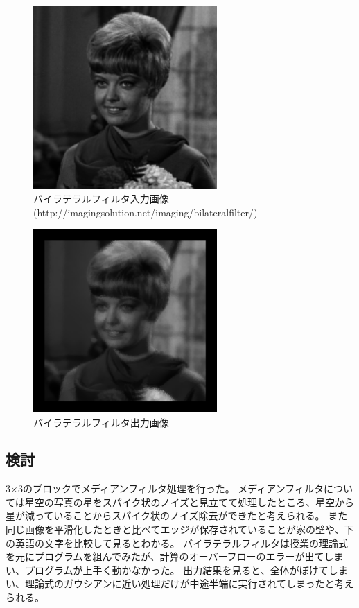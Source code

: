 \documentclass[11pt,a4j]{jsarticle}
\begin{document}
    \begin{figure}[H]
      \centering
      \includegraphics[clip,width=7.0cm ,height= 7.0cm]{./img/bilateral/bi_source.png}
      \caption{バイラテラルフィルタ入力画像(http://imagingsolution.net/imaging/bilateralfilter/)\label{fig:bilateral_source}}
    \end{figure}
    \begin{figure}[H]
      \centering
      \includegraphics[clip,width=7.0cm ,height= 7.0cm]{./img/bilateral/bi.png}
      \caption{バイラテラルフィルタ出力画像\label{fig:bilateral_result}}
    \end{figure}

    \subsection{検討}
    3×3のブロックでメディアンフィルタ処理を行った。
    メディアンフィルタについては星空の写真の星をスパイク状のノイズと見立てて処理したところ、星空から星が減っていることからスパイク状のノイズ除去ができたと考えられる。
    また同じ画像を平滑化したときと比べてエッジが保存されていることが家の壁や、下の英語の文字を比較して見るとわかる。
    バイラテラルフィルタは授業の理論式を元にプログラムを組んでみたが、計算のオーバーフローのエラーが出てしまい、プログラムが上手く動かなかった。
    出力結果を見ると、全体がぼけてしまい、理論式のガウシアンに近い処理だけが中途半端に実行されてしまったと考えられる。
\end{document}
